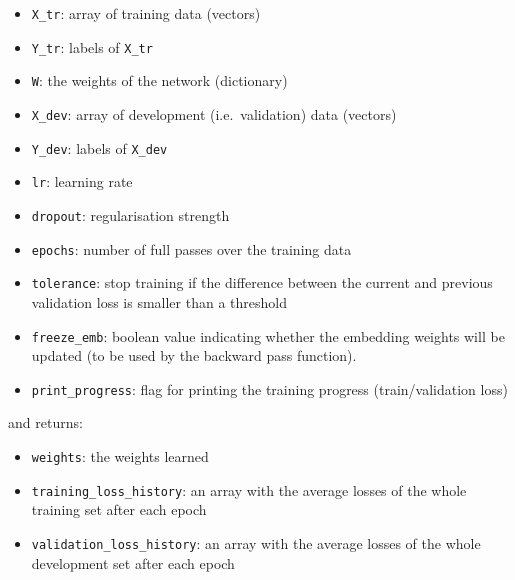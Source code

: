 \documentclass[11pt]{article}
\providecommand{\tightlist}{%
      \setlength{\itemsep}{0pt}\setlength{\parskip}{0pt}}
\begin{document}
\begin{itemize}
\tightlist
\item
  \texttt{X\_tr}: array of training data (vectors)
\item
  \texttt{Y\_tr}: labels of \texttt{X\_tr}
\item
  \texttt{W}: the weights of the network (dictionary)
\item
  \texttt{X\_dev}: array of development (i.e.~validation) data (vectors)
\item
  \texttt{Y\_dev}: labels of \texttt{X\_dev}
\item
  \texttt{lr}: learning rate
\item
  \texttt{dropout}: regularisation strength
\item
  \texttt{epochs}: number of full passes over the training data
\item
  \texttt{tolerance}: stop training if the difference between the
  current and previous validation loss is smaller than a threshold
\item
  \texttt{freeze\_emb}: boolean value indicating whether the embedding
  weights will be updated (to be used by the backward pass function).
\item
  \texttt{print\_progress}: flag for printing the training progress
  (train/validation loss)
\end{itemize}

and returns:

\begin{itemize}
\tightlist
\item
  \texttt{weights}: the weights learned
\item
  \texttt{training\_loss\_history}: an array with the average losses of
  the whole training set after each epoch
\item
  \texttt{validation\_loss\_history}: an array with the average losses
  of the whole development set after each epoch
\end{itemize}
\end{document}
